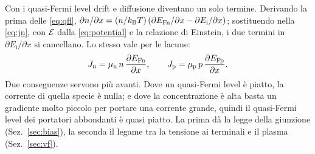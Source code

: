 \documentclass[10pt,a4paper]{scrartcl}
\let\newcommand\pdvaluedefine
\newcommand{\Ef}{\mathcal{E}}                 %
\newcommand{\mun}{\mu_\mathrm{n}}
\newcommand{\mup}{\mu_\mathrm{p}}
\newcommand{\Jn}{J_\mathrm{n}}
\newcommand{\Jp}{J_\mathrm{p}}
\newcommand{\kB}{k_\mathrm{B}}
\newcommand{\EFn}{E_\mathrm{Fn}}
\newcommand{\EFp}{E_\mathrm{Fp}}
\newcommand{\dpar}[2]{\frac{\partial #1}{\partial #2}}
\begin{document}
Con i quasi-Fermi level drift e diffusione diventano un solo termine. Derivando la prima delle \eqref{eq:qfl}, $\partial n/\partial x = (n/\kB T)\,(\partial\EFn/\partial x - \partial E_\mathrm{i}/\partial x)$; sostituendo nella \eqref{eq:jn}, con $\Ef$ dalla \eqref{eq:potential} e la relazione di Einstein, i due termini in $\partial E_\mathrm{i}/\partial x$ si cancellano. Lo stesso vale per le lacune:
\begin{equation}
\Jn = \mun\,n\,\dpar{\EFn}{x} , \qquad \Jp = \mup\,p\,\dpar{\EFp}{x} .
\label{eq:jqfl}
\end{equation}
Due conseguenze servono più avanti. Dove un quasi-Fermi level è piatto, la corrente di quella specie è nulla; e dove la concentrazione è alta basta un gradiente molto piccolo per portare una corrente grande, quindi il quasi-Fermi level dei portatori abbondanti è quasi piatto. La prima dà la legge della giunzione (Sez.~\ref{sec:bias}), la seconda il legame tra la tensione ai terminali e il plasma (Sez.~\ref{sec:vf}).
\end{document}
